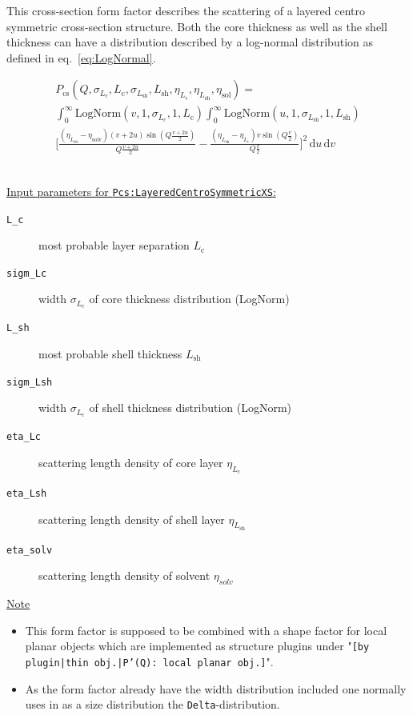 This cross-section form factor describes the scattering of a layered centro symmetric cross-section structure.
Both the core thickness as well as the shell thickness can have a distribution described by a log-normal distribution as defined in eq.\ \ref{eq:LogNormal}.

\begin{multline}
P_\text{cs}(Q,\sigma_{L_\textrm{c}},L_\textrm{c},\sigma_{L_\textrm{sh}},L_\textrm{sh},\eta_{L_\textrm{c}},\eta_{L_\textrm{sh}},\eta_\textrm{sol}) = \\
\int_0^\infty \textrm{LogNorm}(v,1,\sigma_{L_\textrm{c}},1,L_\textrm{c})
\int_0^\infty \textrm{LogNorm}(u,1,\sigma_{L_\textrm{sh}},1,L_\textrm{sh}) \\
     \Bigg[ \frac{(\eta_{L_\textrm{sh}}-\eta_\textrm{solv})(v+2u) \sin\left(Q\frac{v+2u}{2}\right)}{Q\frac{v+2u}{2}}
          -\frac{(\eta_{L_\textrm{sh}}-\eta_{L_\textrm{c}})  v   \sin\left(Q \frac{v}{2}\right)}{Q \frac{v}{2}}
    \Bigg]^2 \,
\textrm{d}u \, \textrm{d}v
\end{multline}

\vspace{5mm}

\hspace{1pt}\\
\underline{Input parameters for \texttt{Pcs:LayeredCentroSymmetricXS}:}
\begin{description}
    \item[\texttt{L\_c}] most probable layer separation $L_\textrm{c}$
    \item[\texttt{sigm\_Lc}] width $\sigma_{L_\textrm{c}}$ of core thickness distribution (LogNorm)
    \item[\texttt{L\_sh}] most probable shell thickness $L_\textrm{sh}$
    \item[\texttt{sigm\_Lsh}] width $\sigma_{L_\textrm{c}}$ of shell thickness distribution (LogNorm)
    \item[\texttt{eta\_Lc}] scattering length density of core layer $\eta_{L_\textrm{c}}$
    \item[\texttt{eta\_Lsh}] scattering length density of shell layer $\eta_{L_\textrm{sh}}$
    \item[\texttt{eta\_solv}] scattering length density of solvent $\eta_{solv}$
\end{description}

\noindent
\underline{Note}
\begin{itemize}
  \item This form factor is supposed to be combined with a shape factor for
local planar objects which are implemented as structure  plugins
under "\texttt{[by plugin|thin obj.|P'(Q): local planar
obj.]}".
\item As the form factor already have the width distribution included one normally uses in \SASfit as a size distribution
the \texttt{Delta}-distribution.
\end{itemize}


